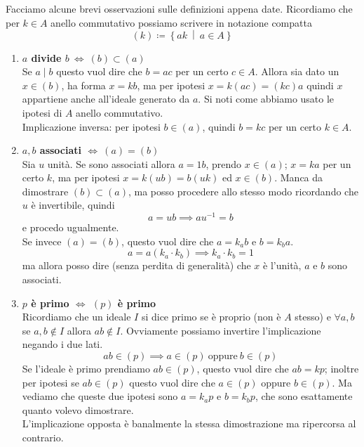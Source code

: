 \begin{osservazione} 
	Facciamo alcune brevi osservazioni sulle definizioni appena date. Ricordiamo che per $k \in A$ anello commutativo possiamo scrivere in notazione compatta 
	\begin{equation*}
	(k) \coloneqq \left\{ak \ \middle| \ a \in A\right\}
	\end{equation*}
	\begin{enumerate}
		\item \textbf{$a$ divide $ b \ \iff \ (b) \subset (a)$}\\
		Se $a\mid b$ questo vuol dire che $b=ac$ per un certo $c \in A$. Allora sia dato un $x \in (b)$, ha forma $x=kb$, ma per ipotesi $x=k(ac)=(kc)a$ quindi $x$ appartiene anche all'ideale generato da $a$. Si noti come abbiamo usato le ipotesi di $A$ anello commutativo.\\
		Implicazione inversa: per ipotesi $b \in (a)$, quindi $b=kc$ per un certo $k \in A$.
		\item \textbf{$a,b$ associati $\iff \ (a)=(b)$}\\
		Sia $u$ unità. Se sono associati allora $a=1b$, prendo $x \in (a)$; $x=ka$ per un certo $k$, ma per ipotesi $x=k(ub)=b(uk)$ ed $x \in (b)$. Manca da dimostrare $(b) \subset (a)$, ma posso procedere allo stesso modo ricordando che $u$ è invertibile, quindi 
		\begin{equation*}
		a=ub \implies au^{-1}=b
		\end{equation*}
		e procedo ugualmente. \\ 
		Se invece $(a)=(b)$, questo vuol dire che $a=k_ab$ e $b=k_ba$. 
		\begin{equation*}
		a=a(k_a\cdot k_b) \implies k_a\cdot k_b=1 
		\end{equation*}
 		ma allora posso dire (senza perdita di generalità) che $x$ è l'unità, $a$ e $b$ sono associati.
		\item \textbf{$p$ è primo $\iff$ $(p)$ è primo}\\
		Ricordiamo che un ideale $I$ si dice primo se è proprio (non è $A$ stesso) e $\forall a,b$ se $a,b\notin I$ allora $ab \notin I$. Ovviamente possiamo invertire l'implicazione negando i due lati. 
		\begin{equation*}
		ab \in (p) \implies a \in (p) \ \text{oppure} \ b \in (p)
		\end{equation*}
		Se l'ideale è primo prendiamo $ab \in (p)$, questo vuol dire che $ab=kp$; inoltre per ipotesi se $ab\in(p)$ questo vuol dire che $a\in(p)$ oppure $b\in(p)$.
		Ma vediamo che queste due ipotesi sono $a=k_ap$ e $b=k_bp$, che sono esattamente quanto volevo dimostrare. \\ L'implicazione opposta è banalmente la stessa dimostrazione ma ripercorsa al contrario.

\end{enumerate}
\end{osservazione}
